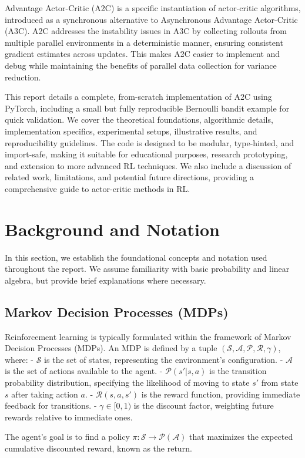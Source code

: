\documentclass[11pt]{article}
\begin{document}
Advantage Actor-Critic (A2C) is a specific instantiation of actor-critic algorithms, introduced as a synchronous alternative to Asynchronous Advantage Actor-Critic (A3C). A2C addresses the instability issues in A3C by collecting rollouts from multiple parallel environments in a deterministic manner, ensuring consistent gradient estimates across updates. This makes A2C easier to implement and debug while maintaining the benefits of parallel data collection for variance reduction.

This report details a complete, from-scratch implementation of A2C using PyTorch, including a small but fully reproducible Bernoulli bandit example for quick validation. We cover the theoretical foundations, algorithmic details, implementation specifics, experimental setups, illustrative results, and reproducibility guidelines. The code is designed to be modular, type-hinted, and import-safe, making it suitable for educational purposes, research prototyping, and extension to more advanced RL techniques. We also include a discussion of related work, limitations, and potential future directions, providing a comprehensive guide to actor-critic methods in RL.
\section{Background and Notation}
In this section, we establish the foundational concepts and notation used throughout the report. We assume familiarity with basic probability and linear algebra, but provide brief explanations where necessary.

\subsection{Markov Decision Processes (MDPs)}
Reinforcement learning is typically formulated within the framework of Markov Decision Processes (MDPs). An MDP is defined by a tuple $(\mathcal{S}, \mathcal{A}, \mathcal{P}, \mathcal{R}, \gamma)$, where:
- $\mathcal{S}$ is the set of states, representing the environment's configuration.
- $\mathcal{A}$ is the set of actions available to the agent.
- $\mathcal{P}(s'|s,a)$ is the transition probability distribution, specifying the likelihood of moving to state $s'$ from state $s$ after taking action $a$.
- $\mathcal{R}(s,a,s')$ is the reward function, providing immediate feedback for transitions.
- $\gamma \in [0,1)$ is the discount factor, weighting future rewards relative to immediate ones.

The agent's goal is to find a policy $\pi: \mathcal{S} \to \mathcal{P}(\mathcal{A})$ that maximizes the expected cumulative discounted reward, known as the return.
\end{document}
